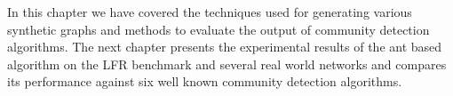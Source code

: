 \begin{spacing}{1.5}
\indent In this chapter we have covered the techniques used for generating various synthetic graphs and methods to evaluate the output of community detection algorithms. The next chapter presents the experimental results of the ant based algorithm on the LFR benchmark and several real world networks and compares its performance against six well known community detection algorithms.
\end{spacing}
